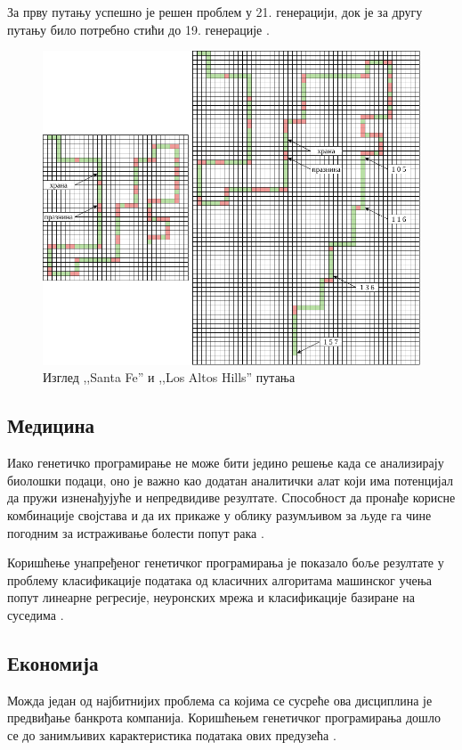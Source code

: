 \documentclass[a4paper]{article}
\begin{document}
За прву путању успешно је решен проблем у 21. генерацији, док је за другу путању било потребно стићи до 19. генерације \cite{koza}.

\begin{figure}[h!]
    \begin{center}
        \includegraphics[scale=0.35]{santa_fe.png}
    \end{center}
    \caption{Изглед ,,Santa Fe'' и ,,Los Altos Hills'' путања}
    \label{fig:santa_fe}
\end{figure}

\subsection{Медицина}
Иако генетичко програмирање не може бити једино решење када се анализирају биолошки подаци, оно је важно као додатан аналитички алат који има потенцијал да пружи изненађујуће и непредвидиве резултате. Способност да пронађе корисне комбинације својстава и да их прикаже у облику разумљивом за људе га чине погодним за истраживање болести попут рака \cite{cancer}.

Коришћење унапређеног генетичког програмирања је показало боље резултате у проблему класификације података од класичних алгоритама машинског учења попут линеарне регресије, неуронских мрежа и класификације базиране на суседима \cite{egp}.
\subsection{Економија}
Можда један од најбитнијих проблема са којима се сусреће ова дисциплина је предвиђање банкрота компанија. Коришћењем генетичког програмирања дошло се до занимљивих карактеристика података ових предузећа \cite{bankruptcy}.
\end{document}
